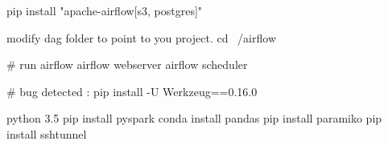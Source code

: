 pip install "apache-airflow[s3, postgres]"

modify dag folder to point to you project.
cd ~/airflow

# run airflow
airflow webserver
airflow scheduler

# bug detected :
pip install -U Werkzeug==0.16.0


python 3.5
pip install pyspark 
conda install pandas 
pip install paramiko
pip install sshtunnel

